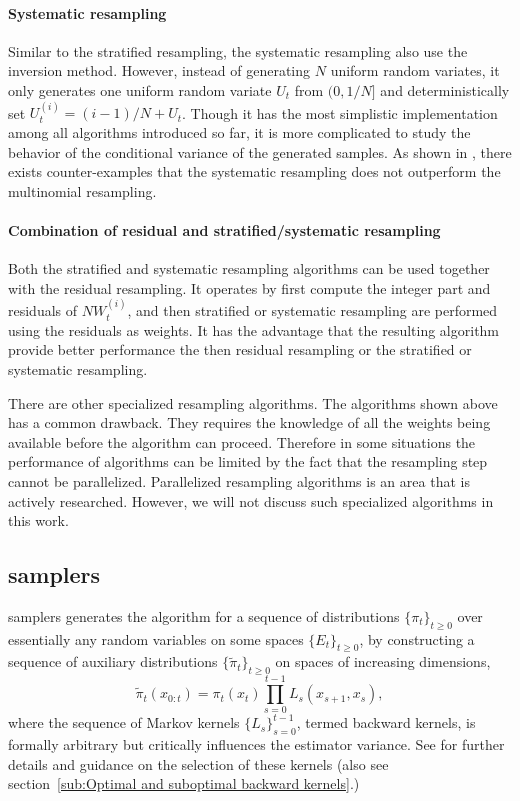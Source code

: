 \paragraph{Systematic resampling} Similar to the stratified resampling, the
systematic resampling also use the inversion method. However, instead of
generating $N$ uniform random variates, it only generates one uniform random
variate $U_t$ from $(0, 1/N]$ and deterministically set $U_t^{(i)} = (i - 1)/N
+ U_t$. Though it has the most simplistic implementation among all algorithms
introduced so far, it is more complicated to study the behavior of the
conditional variance of the generated samples. As shown in \cite{Douc:2005wa},
there exists counter-examples that the systematic resampling does not
outperform the multinomial resampling.

\paragraph{Combination of residual and stratified/systematic resampling} Both
the stratified and systematic resampling algorithms can be used together with
the residual resampling. It operates by first compute the integer part and
residuals of $NW_t^{(i)}$, and then stratified or systematic resampling are
performed using the residuals as weights. It has the advantage that the
resulting algorithm provide better performance the then residual resampling or
the stratified or systematic resampling.

There are other specialized resampling algorithms. The algorithms shown above
has a common drawback. They requires the knowledge of all the weights being
available before the algorithm can proceed. Therefore in some situations the
performance of \smc algorithms can be limited by the fact that the resampling
step cannot be parallelized. Parallelized resampling algorithms is an area
that is actively researched. However, we will not discuss such specialized
algorithms in this work.

\subsection[SMC samplers]{\protect\smc samplers}
\label{sub:SMC Samplers}

\smc samplers generates the \sis algorithm for a sequence of distributions
$\{\pi_t\}_{t\ge0}$ over essentially any random variables on some spaces
$\{E_t\}_{t\ge0}$, by constructing a sequence of auxiliary distributions
$\{\tilde\pi_t\}_{t\ge0}$ on spaces of increasing dimensions,
\begin{equation}
  \tilde\pi_t(x_{0:t})=\pi_t (x_t) \prod_{s=0}^{t-1} L_s(x_{s+1},x_s),
\end{equation}
where the sequence of Markov kernels $\{L_s\}_{s=0}^{t-1}$, termed backward
kernels, is formally arbitrary but critically influences the estimator
variance. See \cite{DelMoral:2006hc} for further details and guidance on the
selection of these kernels (also see section~\ref{sub:Optimal and suboptimal
  backward kernels}.)

